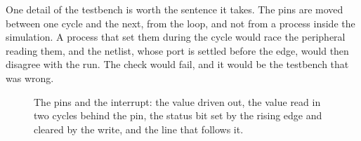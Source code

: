 One detail of the testbench is worth the sentence it takes. The pins
are moved between one cycle and the next, from the loop, and not from
a process inside the simulation. A process that set them during the
cycle would race the peripheral reading them, and the netlist, whose
port is settled before the edge, would then disagree with the run.
The check would fail, and it would be the testbench that was wrong.

\begin{figure}[htbp]
\centering

\caption{The pins and the interrupt: the value driven out, the value
read in two cycles behind the pin, the status bit set by the rising
edge and cleared by the write, and the line that follows it.}
\label{fig:x-gpio}
\end{figure}




